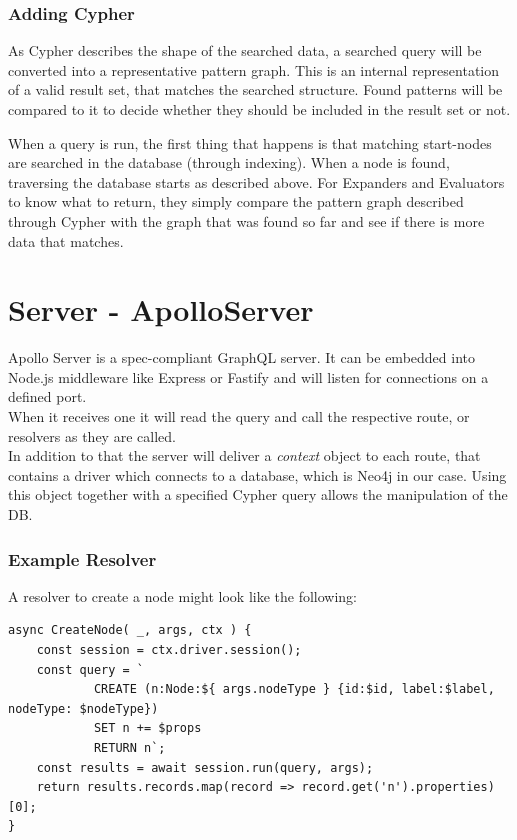 \subsubsection{Adding Cypher}
As Cypher describes the shape of the searched data, a searched query will be converted into a representative pattern graph. This is an internal representation of a valid result set, that matches the searched structure. Found patterns will be compared to it to decide whether they should be included in the result set or not. \cite{NeoInternals}

When a query is run, the first thing that happens is that matching start-nodes are searched in the database (through indexing). When a node is found, traversing the database starts as described above. For Expanders and Evaluators to know what to return, they simply compare the pattern graph described through Cypher with the graph that was found so far and see if there is more data that matches. \cite{NeoInternals}

\section{Server - ApolloServer}
Apollo Server is a spec-compliant GraphQL server. It can be embedded into Node.js middleware like Express or Fastify \cite{ApolloServerIntro} and will listen for connections on a defined port. \\
When it receives one it will read the query and call the respective route, or resolvers as they are called. \\
In addition to that the server will deliver a \emph{context} object to each route, that contains a driver which connects to a database, which is Neo4j in our case. Using this object together with a specified Cypher query allows the manipulation of the DB. 

\subsubsection{Example Resolver}
A resolver to create a node might look like the following:

\begin{lstlisting}[caption={A Basic Resolver},label={ex241}]
async CreateNode( _, args, ctx ) { 
	const session = ctx.driver.session(); 
	const query = ` 
			CREATE (n:Node:${ args.nodeType } {id:$id, label:$label, nodeType: $nodeType}) 
			SET n += $props 
			RETURN n`; 
	const results = await session.run(query, args);
	return results.records.map(record => record.get('n').properties)[0]; 
}
\end{lstlisting}

